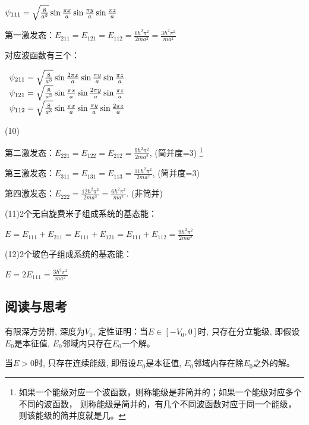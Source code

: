 $\psi _{111}  = \sqrt {{\textstyle{8 \over {a^3 }}}} \sin {\textstyle{{\pi x} \over a}}\sin {\textstyle{{\pi y} \over a}}\sin {\textstyle{{\pi z} \over a}}$


第一激发态：$E_{211}  = E_{121}  = E_{112}  = \frac{{6\hbar ^2 \pi ^2 }}{{2ma^2 }} = \frac{{3\hbar ^2 \pi ^2 }}{{ma^2 }}$

对应波函数有三个：

$\begin{array}{l}
 \psi _{211}  = \sqrt {{\textstyle{8 \over {a^3 }}}} \sin {\textstyle{{2\pi x} \over a}}\sin {\textstyle{{\pi y} \over a}}\sin {\textstyle{{\pi z} \over a}} \\
 \psi _{121}  = \sqrt {{\textstyle{8 \over {a^3 }}}} \sin {\textstyle{{\pi x} \over a}}\sin {\textstyle{{2\pi y} \over a}}\sin {\textstyle{{\pi z} \over a}} \\
 \psi _{112}  = \sqrt {{\textstyle{8 \over {a^3 }}}} \sin {\textstyle{{\pi x} \over a}}\sin {\textstyle{{\pi y} \over a}}\sin {\textstyle{{2\pi z} \over a}} \\
 \end{array}$

(10)

第二激发态：$E_{221}  = E_{122}  = E_{212}  = \frac{{9\hbar ^2 \pi ^2 }}{{2ma^2 }}$, (简并度=3)
\footnote{如果一个能级对应一个波函数，则称能级是非简并的；如果一个能级对应多个不同的波函数，
则称能级是简并的，有几个不同波函数对应于同一个能级，则该能级的简并度就是几。}

第三激发态：$E_{311}  = E_{131}  = E_{113}  = \frac{{11\hbar ^2 \pi ^2 }}{{2ma^2 }}$, (简并度=3)

第四激发态：$E_{222}  = \frac{{12\hbar ^2 \pi ^2 }}{{2ma^2 }} = \frac{{6\hbar ^2 \pi ^2 }}{{ma^2 }}$. (非简并)

(11)2个无自旋费米子组成系统的基态能：

$E = E_{111}  + E_{211}  = E_{111}  + E_{121}  = E_{111}  + E_{112}  = \frac{{9\hbar ^2 \pi ^2 }}{{2ma^2 }}$


(12)2个玻色子组成系统的基态能：

$E = 2E_{111}  = \frac{{3\hbar ^2 \pi ^2 }}{{ma^2 }}$


\subsection*{阅读与思考}



有限深方势阱, 深度为$V_0$, 定性证明：当$E \in \left[ { - V_0 ,0}
\right]$时, 只存在分立能级, 即假设$E_0$是本征值,
$E_0$邻域内只存在$E_0$一个解。

当$E > 0$时, 只存在连续能级, 即假设$E_0$是本征值,
$E_0$邻域内存在除$E_0$之外的解。
